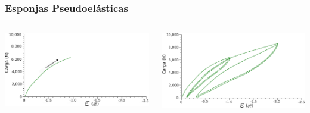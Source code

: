 \documentclass[usenames,dvipsnames]{beamer}
\begin{document}
\begin{frame}

\frametitle{Esponjas Pseudoelásticas}
 
 \begin{columns}
 \includegraphics[width=\textwidth]{img/intro/Graph5111b.eps}
 
 \includegraphics[width=\textwidth]{img/intro/Graph533b.eps}
 

\end{columns}
\end{frame}
\end{document}
